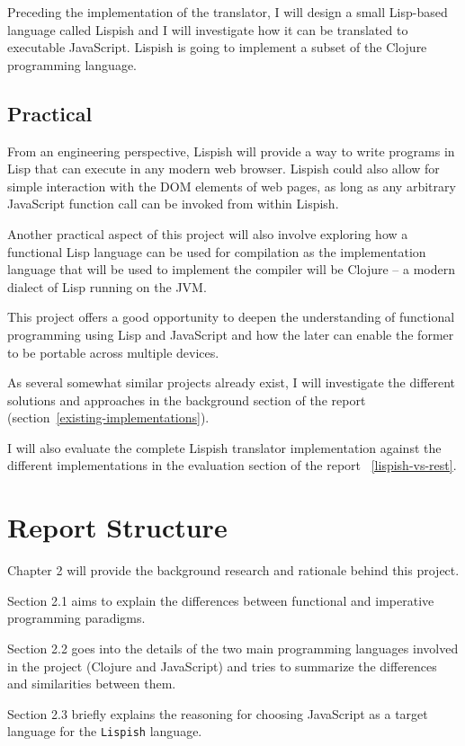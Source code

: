 \documentclass[11pt]{informatics-report}
\begin{document}
Preceding the implementation of the translator, I will design a small Lisp-based language called Lispish and I will investigate how it can be translated to executable JavaScript. Lispish is going to implement a subset of the Clojure programming language.

\subsection{Practical}
From an engineering perspective, Lispish will provide a way to write programs in Lisp that can execute in any modern web browser. Lispish could also allow for simple interaction with the DOM elements of web pages, as long as any arbitrary JavaScript function call can be invoked from within Lispish.

Another practical aspect of this project will also involve exploring how a functional Lisp language can be used for compilation as the implementation language that will be used to implement the compiler will be Clojure -- a modern dialect of Lisp running on the JVM.  

This project offers a good opportunity to deepen the understanding of functional programming using Lisp and JavaScript and how the later can enable the former to be portable across multiple devices.

As several somewhat similar projects already exist, I will investigate the different solutions and approaches in the background section of the report (section~\ref{existing-implementations}).

I will also evaluate the complete Lispish translator implementation against the different implementations in the evaluation section of the report ~\ref{lispish-vs-rest}.

\section{Report Structure}
Chapter 2 will provide the background research and rationale behind this project.

Section 2.1 aims to explain the differences between functional and imperative programming paradigms. 

Section 2.2 goes into the details of the two main programming languages involved in the project (Clojure and JavaScript) and tries to summarize the differences and similarities between them. 

Section 2.3 briefly explains the reasoning for choosing JavaScript as a target language for the \texttt{Lispish} language.
\end{document}
